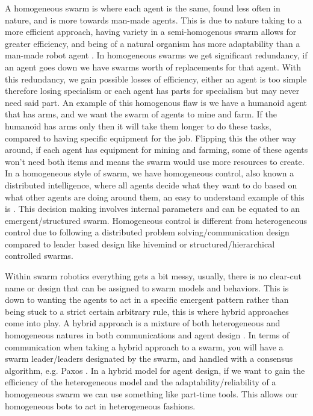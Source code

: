 \documentclass{UoYCSproject}
\begin{document}
A homogeneous swarm is where each agent is the same, found less often in nature, and is more towards man-made agents. 
This is due to nature taking to a more efficient approach, having variety in a semi-homogenous swarm allows for greater efficiency, and being of a natural organism has more adaptability than a man-made robot agent \cite{Swarm robotics reviewed, Swarm intellegiegence}.
In homogeneous swarms we get significant redundancy, if an agent goes down we have swarms worth of replacements for that agent.
With this redundancy, we gain possible losses of efficiency, either an agent is too simple therefore losing specialism or each agent has parts for specialism but may never need said part.
An example of this homogenous flaw is we have a humanoid agent that has arms, and we want the swarm of agents to mine and farm. 
If the humanoid has arms only then it will take them longer to do these tasks, compared to having specific equipment for the job.
Flipping this the other way around, if each agent has equipment for mining and farming, some of these agents won't need both items and means the swarm would use more resources to create.
In a homogeneous style of swarm, we have homogeneous control, also known a distributed intelligence, where all agents decide what they want to do based on what other agents are doing around them, an easy to understand example of this is \cite{Boids}. 
This decision making involves internal parameters and can be equated to an emergent/structured swarm.
Homogeneous control is different from heterogeneous control due to following a distributed problem solving/communication design compared to leader based design like hivemind or structured/hierarchical controlled swarms.

Within swarm robotics everything gets a bit messy, usually, there is no clear-cut name or design that can be assigned to swarm models and behaviors. 
This is down to wanting the agents to act in a specific emergent pattern rather than being stuck to a strict certain arbitrary rule, this is where hybrid approaches come into play.
A hybrid approach is a mixture of both heterogeneous and homogeneous natures in both communications and agent design \cite{Swarm robotics reviewed, Swarm intellegiegence}.
In terms of communication when taking a hybrid approach to a swarm, you will have a swarm leader/leaders designated by the swarm, and handled with a consensus algorithm, e.g. Paxos \cite{Paxos}.
In a hybrid model for agent design, if we want to gain the efficiency of the heterogeneous model and the adaptability/reliability of a homogeneous swarm we can use something like part-time tools. 
This allows our homogeneous bots to act in heterogeneous fashions.
\end{document}
